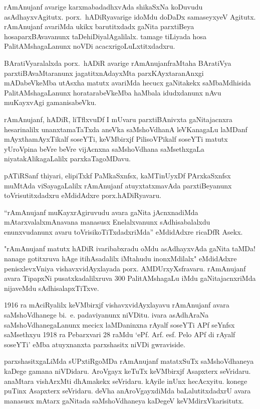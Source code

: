 rAmAnujanf avarige karxmabadadhxvAda shikaSxNa koDuvudu asAdhayxvAgitutx.
porx.~hADiRyavarige idoMdu doDaDx samaseyxyeV Agitutx. rAmAnujanf avariMda ukikx barutitxdadx gaNita parxtiBeya hosaparxBAvavanunx taDehiDiyalAgalilalx. tamage tiLiyada hosa PalitAMshagaLanunx noVDi acacxrigoLuLxtitxdadxru.
\vskip 0.1cm

BAratiVyaralalxda porx.~hADiR avarige rAmAnujanfraMtaha BAratiVya parxtiBA\-vaMtaranunx jagatitxnAdayxMta parxKAyxtaranAnxgi mADabeVkeMba utAsxha matutx avariMda hecucx gaNitakekx saMbaMdhisida PalitAMshagaLanunx horatarabeVkeMba haMbala idudxdanunx nAvu muKayxvAgi gamanisabeVku.
\vskip 0.1cm

rAmAnujanf, hADiR, liTflxvuDf I mUvaru parxtiBAnivxta gaNitajacnxra hesarinalilx unanxtamaTaTxda aneVka saMshoVdhanA leVKanagaLu laMDanf mAyxthamAyxTikalf soseYTi, keVMbirxjf PilisoVPikalf soseYTi matutx yUroVpina beVre beVre vijAcnxna saMshoV\-dhana saMsethxgaLa niyatakAlikagaLalilx parxkaTagoMDavu.
\vskip 0.1cm

pATiRSanf thiyari, elipiTxkf PaMkaSxnfsx, kaMTinUyxDf PArxkaSxnfsx muMtAda viSayagaLalilx rAmAnujanf atuyxtatxmavAda parxtiBeyanunx toVrisutitxdadxru eMdidAdxre porx.hADiRyavaru.
\vskip 0.1cm

``rAmAnujanf muKayxrAgiruvudu avara gaNita jAcnxnadiMda mAtarxvalalx\break mAnavana manasusx Enelalxvanunx sAdhisabalalxdu enunxvudanunx avaru toVrisikoTiTx\-dadxriMda'' eMdidAdxre ricaDfR Asekx.
\vskip 0.1cm

"rAmAnujanf matutx hADiR ivaribabxradu oMdu asAdhayxvAda gaNita taMDa! nanage gotitxruva hAge itihAsadalilx iMtahudu inonxMdilalx" eMdidAdxre penisxlevxVniya vishavxvidAyxlayada porx. AMDUrxyXsfravaru. rAmAnujanf avara TipapxNi pusatxkadalilxruva {\rm 300} PalitAMshagaLu iMdu gaNitajacnxriMda nijaveMdu sAdhisalapxTiTxve.

{\rm 1916} ra mAciRyalilx keVMbirxjf vishavxvidAyxlayavu rAmAnujanf avara saMshoVdhanege bi.~e. padaviyanunx niVDitu. ivara asAdhAraNa saMshoVdhanegaLanunx mecicx laMDaninxna rAyalf soseYTi APf seYnfsx saMsethxyu {\rm 1918} ra Pebarxvari {\rm 28} raMdu `ePf. Arf. esf. Pelo APf di rAyalf soseYTi' eMba atuyxnanxta parxshasitx niVDi gwraviside.

parxshasitxgaLiMda sUPxtiRgoMDa rAmAnujanf matatxSuTx saMshoVdhaneya kaDege gamana niVDidaru. AroVgayx keTuTx keVMbirxjf Asapxterx seVridaru. anaMtara vishArxMti dhAmakekx seVridaru. kAyile inUnx hecAcxyitu. konege puTinx Asapxterx seVridaru. deVha anAroVgayxdiMda baLalutitxdadxrU avara manasusx mAtarx gaNitada saMshoVdhaneya kaDegeV keVMdirxVkarisitutx.

